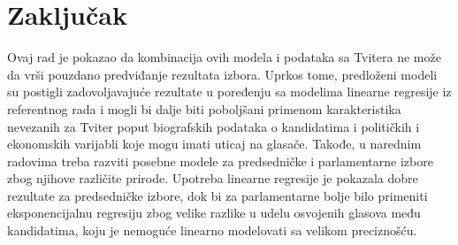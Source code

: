 \section{Zaključak}

Ovaj rad je pokazao da kombinacija ovih modela i podataka sa Tvitera ne može da vrši pouzdano predviđanje rezultata izbora. Uprkos tome, predloženi modeli su postigli zadovoljavajuće rezultate u poređenju sa modelima linearne regresije iz referentnog rada \parencite{zolghadr2018election} i mogli bi dalje biti poboljšani primenom karakteristika nevezanih za Tviter poput biografskih podataka o kandidatima i političkih i ekonomskih varijabli koje mogu imati uticaj na glasače. Takođe, u narednim radovima treba razviti posebne modele za predsedničke i parlamentarne izbore zbog njihove različite prirode. Upotreba linearne regresije je pokazala dobre rezultate za predsedničke izbore, dok bi za parlamentarne bolje bilo primeniti eksponencijalnu regresiju zbog velike razlike u udelu osvojenih glasova među kandidatima, koju je nemoguće linearno modelovati sa velikom preciznošću.

\printbibliography[heading=subbibliography,title={Literatura}]
\EndPaper
